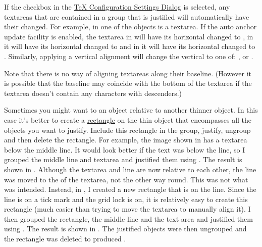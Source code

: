 If the  \gls{checkbox} in the
\hyperref[sec:texconfig]{TeX Configuration Settings Dialog} is
selected, any \glspl{textarea} that are contained in a group that is
justified will automatically have their  changed.
For example, in  one of the objects is a
\gls*{textarea}.  If the auto anchor update facility is enabled, the
\gls*{textarea} in  will have its
horizontal  changed to ,
in  it will have its horizontal
 changed to  and in
 it will have its horizontal
 changed to . Similarly,
applying a vertical alignment will change the vertical
 to one of: ,
 or .

\begin{information}
Note that there is no way of aligning \glspl{textarea} along their
baseline. (However it is possible that the baseline may coincide
with the bottom of the \gls*{textarea} if the \gls*{textarea} doesn't contain
any characters with descenders.)
\end{information}

 Sometimes you might want to  an
\gls{object} relative to another thinner object. In this case it's
better to create a \hyperref[sec:rectangles]{rectangle}
 on the thin object that encompasses all the objects
you want to justify.  Include this rectangle in the \gls{group},
justify, ungroup and then delete the rectangle. For example, the
image shown in  has a \gls{textarea} below
the middle line. It would look better if the text was
 below the line, so I grouped the middle line and
\gls{textarea} and justified them using
. The result is shown in
. Although the \gls{textarea} and line are
now  relative to each other, the line was moved to
the  of the \gls{textarea}, not the other way round.
This was not what was intended. Instead, in
, I created a new rectangle that is
 on the line. Since the line is on a tick mark and
the grid lock is on, it is relatively easy to create this rectangle
(much easier than trying to move the \gls{textarea} to manually
align it). I then grouped the rectangle, the middle line and the
text area and justified them using .
The result is shown in . The justified
objects were then ungrouped and the rectangle was deleted to
produced .

